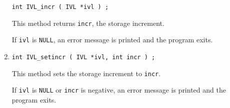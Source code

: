 \begin{enumerate}
\begin{verbatim}
int IVL_incr ( IVL *ivl ) ;
\end{verbatim}
This method returns {\tt incr}, the storage increment.
\par {}
If {\tt ivl} is {\tt NULL},
an error message is printed and the program exits.
\item
\begin{verbatim}
int IVL_setincr ( IVL *ivl, int incr ) ;
\end{verbatim}
This method sets the storage increment to {\tt incr}.
\par {}
If {\tt ivl} is {\tt NULL} or {\tt incr} is negative,
an error message is printed and the program exits.
\end{enumerate}
\par
